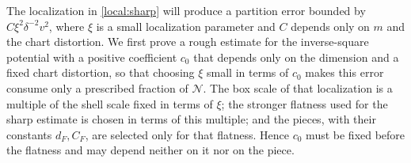 The localization in \cref{local:sharp} will produce a partition error
bounded by $C\xi^2\delta^{-2}v^2$, where $\xi$ is a small localization
parameter and $C$ depends only on $m$ and the chart distortion.  We
first prove a rough estimate for the inverse-square potential with a positive coefficient $c_0$
that depends only on the dimension and a fixed chart distortion, so
that choosing $\xi$ small in terms of $c_0$ makes this error consume
only a prescribed fraction of $\mathcal N$.  The box scale of that
localization is a multiple of the shell scale fixed in terms of
$\xi$; the stronger flatness used for the sharp estimate is chosen
in terms of this multiple; and the pieces, with their constants
$d_F,C_F$, are selected only for that flatness.  Hence $c_0$ must be
fixed before the flatness and may depend neither on it nor on the
piece.

